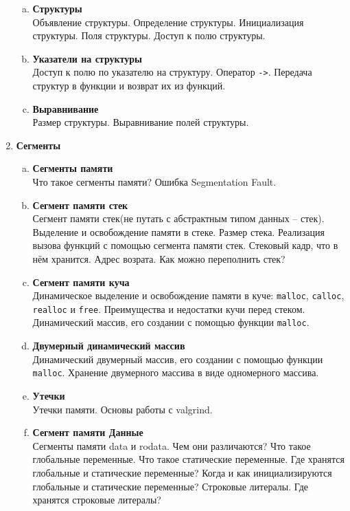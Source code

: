 \documentclass{article}
\begin{document}
\begin{enumerate}
\begin{enumerate}[a.]
\item \textbf{Структуры}\\
Объявление структуры. Определение структуры. Инициализация структуры. Поля структуры. Доступ к полю структуры.

\item \textbf{Указатели на структуры}\\
Доступ к полю по указателю на структуру. Оператор \texttt{->}. Передача структур в функции и возврат их из функций.

\item \textbf{Выравнивание}\\
Размер структуры. Выравнивание полей структуры.
\end{enumerate}



\item \textbf{Сегменты}\\

\begin{enumerate}[a.]
\item \textbf{Сегменты памяти}\\
Что такое сегменты памяти? Ошибка Segmentation Fault.

\item \textbf{Сегмент памяти стек}\\
Сегмент памяти стек(не путать с абстрактным типом данных -- стек). Выделение и освобождение памяти в стеке. Размер стека. Реализация вызова функций с помощью сегмента памяти стек. Стековый кадр, что в нём хранится. Адрес возрата.  Как можно переполнить стек? 

\item \textbf{Сегмент памяти куча}\\
Динамическое выделение и освобождение памяти в куче: \texttt{malloc}, \texttt{calloc}, \texttt{realloc} и \texttt{free}. Преимущества и недостатки кучи перед стеком. Динамический массив, его создании с помощью функции \texttt{malloc}.

\item \textbf{Двумерный динамический массив}\\
Динамический двумерный массив, его создании с помощью функции \texttt{malloc}. Хранение двумерного массива в виде одномерного массива.

\item \textbf{Утечки}\\
Утечки памяти. Основы работы с valgrind.

\item \textbf{Сегмент памяти Данные}\\
Сегменты памяти data и rodata. Чем они различаются? Что такое глобальные переменные. Что такое статические переменные. Где хранятся глобальные и статические переменные? Когда и как инициализируются глобальные и статические переменные? Строковые литералы. Где хранятся строковые литералы?


\end{enumerate}
\end{enumerate}
\end{document}
